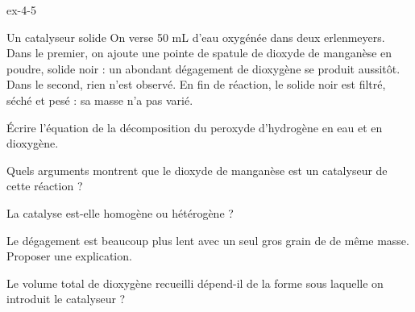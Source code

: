 \begin{blocLivre}{ex-4-5}
\begin{exercice}[1]{Un catalyseur solide}
On verse 50 mL d'eau oxygénée dans deux erlenmeyers. Dans le premier, on ajoute une pointe de spatule de dioxyde de
manganèse  en poudre, solide noir : un abondant dégagement de dioxygène se produit aussitôt. Dans le second,
rien n'est observé. En fin de réaction, le solide noir est filtré, séché et pesé : sa masse n'a pas varié.
\begin{questions}
\item Écrire l'équation de la décomposition du peroxyde d'hydrogène  en eau et en dioxygène.
\item Quels arguments montrent que le dioxyde de manganèse est un catalyseur de cette réaction ?
\item La catalyse est-elle homogène ou hétérogène ?
\item Le dégagement est beaucoup plus lent avec un seul gros grain de  de même masse. Proposer une explication.
\item Le volume total de dioxygène recueilli dépend-il de la forme sous laquelle on introduit le catalyseur ?
\end{questions}
\end{exercice}
\end{blocLivre}
